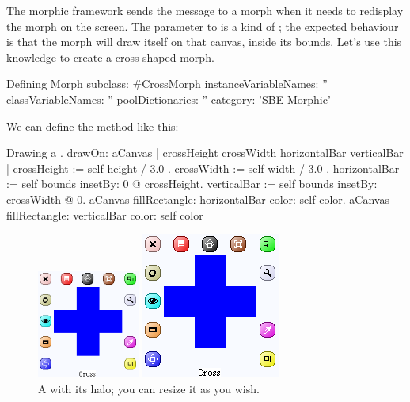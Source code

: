 \documentclass[a4paper,10pt,twoside]{book}
\begin{document}
The morphic framework sends the message  to a morph when it needs to redisplay the morph on the screen.  The parameter to   is a kind of ; the expected behaviour is that the morph will draw itself on that canvas, inside its bounds.
Let's use this knowledge to create a cross-shaped morph.

\begin{classdef}{Defining }
Morph subclass: #CrossMorph
	instanceVariableNames: ''
	classVariableNames: ''
	poolDictionaries: ''
	category: 'SBE-Morphic'
\end{classdef}

We can define the  method like this:
\begin{method}[firstDrawOn]{Drawing a .}
drawOn: aCanvas 
	| crossHeight crossWidth horizontalBar verticalBar |
	crossHeight := self height / 3.0 .
	crossWidth := self width / 3.0 .
	horizontalBar := self bounds insetBy: 0 @ crossHeight.
	verticalBar := self bounds insetBy: crossWidth @ 0.
	aCanvas fillRectangle: horizontalBar color: self color.
	aCanvas fillRectangle: verticalBar color: self color
\end{method}


\begin{figure}[hbt]
	\ifluluelse
		{\centerline{\includegraphics[width=0.3\textwidth]{newCross}}}
		{\centerline{\includegraphics{newCross}}}
	\caption{A  with its halo; you can resize it as you wish.
		\label{fig:cross}}
\end{figure}
\end{document}
